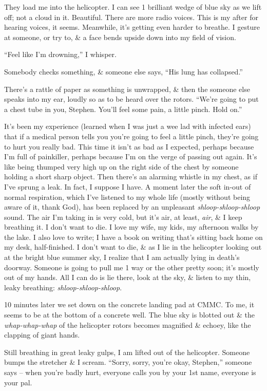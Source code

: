 \documentclass{article}
\numberwithin{equation}{section}
\begin{document}
They load me into the helicopter. I can see 1 brilliant wedge of blue sky as we lift off; not a cloud in it. Beautiful. There are more radio voices. This is my after for hearing voices, it seems. Meanwhile, it's getting even harder to breathe. I gesture at someone, or try to, \& a face bends upside down into my field of vision.

``Feel like I'm drowning,'' I whisper.

Somebody checks something, \& someone else says, ``His lung has collapsed.''

There's a rattle of paper as something is unwrapped, \& then the someone else speaks into my ear, loudly so as to be heard over the rotors. ``We're going to put a chest tube in you, Stephen. You'll feel some pain, a little pinch. Hold on.''

It's been my experience (learned when I was just a wee lad with infected ears) that if a medical person tells you you're going to feel a little pinch, they're going to hurt you really bad. This time it isn't as bad as I expected, perhaps because I'm full of painkiller, perhaps because I'm on the verge of passing out again. It's like being thumped very high up on the right side of the chest by someone holding a short sharp object. Then there's an alarming whistle in my chest, as if I've sprung a leak. In fact, I suppose I have. A moment later the soft in-out of normal respiration, which I've listened to my whole life (mostly without being aware of it, thank God), has been replaced by an unpleasant \textit{shloop-shloop-shloop} sound. The air I'm taking in is very cold, but it's air, at least, \textit{air}, \& I keep breathing it. I don't want to die. I love my wife, my kids, my afternoon walks by the lake. I also love to write; I have a book on writing that's sitting back home on my desk, half-finished. I don't want to die, \& as I lie in the helicopter looking out at the bright blue summer sky, I realize that I am actually lying in death's doorway. Someone is going to pull me 1 way or the other pretty soon; it's mostly out of my hands. All I can do is lie there, look at the sky, \& listen to my thin, leaky breathing: \textit{shloop-shloop-shloop}.

10 minutes later we set down on the concrete landing pad at CMMC. To me, it seems to be at the bottom of a concrete well. The blue sky is blotted out \& the \textit{whap-whap-whap} of the helicopter rotors becomes magnified \& echoey, like the clapping of giant hands.

Still breathing in great leaky gulps, I am lifted out of the helicopter. Someone bumps the stretcher \& I scream. ``Sorry, sorry, you're okay, Stephen,'' someone says -- when you're badly hurt, everyone calls you by your 1st name, everyone is your pal.
\end{document}
